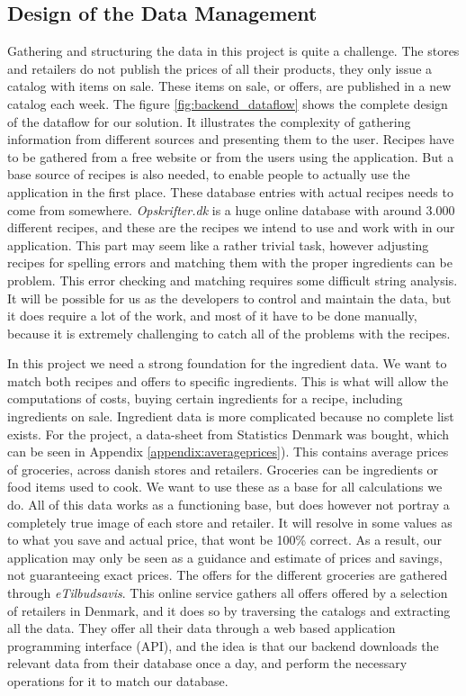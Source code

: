 \subsection{Design of the Data Management}\label{subsec:backend_datamanagement}

Gathering and structuring the data in this project is quite a challenge. The stores and retailers do not publish the prices of all their products, they only issue a catalog with items on sale. These items on sale, or offers, are published in a new catalog each week. The figure \ref{fig:backend_dataflow} shows the complete design of the dataflow for our solution. It illustrates the complexity of gathering information from different sources and presenting them to the user. Recipes have to be gathered from a free website or from the users using the application. But a base source of recipes is also needed, to enable people to actually use the application in the first place. These database entries with actual recipes needs to come from somewhere. \textit{Opskrifter.dk} is a huge online database with around 3.000 different recipes, and these are the recipes we intend to use and work with in our application. This part may seem like a rather trivial task, however adjusting recipes for spelling errors and matching them with the proper ingredients can be problem. This error checking and matching requires some difficult string analysis. It will be possible for us as the developers to control and maintain the data, but it does require a lot of the work, and most of it have to be done manually, because it is extremely challenging to catch all of the problems with the recipes.

In this project we need a strong foundation for the ingredient data. We want to match both recipes and offers to specific ingredients. This is what will allow the computations of costs, buying certain ingredients for a recipe, including ingredients on sale. Ingredient data is more complicated because no complete list exists. For the project, a data-sheet from Statistics Denmark  was bought, which can be seen in Appendix \ref{appendix:averageprices}). This contains average prices of groceries, across danish stores and retailers. Groceries can be ingredients or food items used to cook. We want to use these as a base for all calculations we do. All of this data works as a functioning base, but does however not portray a completely true image of each store and retailer. It will resolve in some values as to what you save and actual price, that wont be 100\% correct. As a result, our application may only be seen as a guidance and estimate of prices and savings, not guaranteeing exact prices. The offers for the different groceries are gathered through \textit{eTilbudsavis}. This online service gathers all offers offered by a selection of retailers in Denmark, and it does so by traversing the catalogs and extracting all the data. They offer all their data through a web based application programming interface (API), and the idea is that our backend downloads the relevant data from their database once a day, and perform the necessary operations for it to match our database. 


